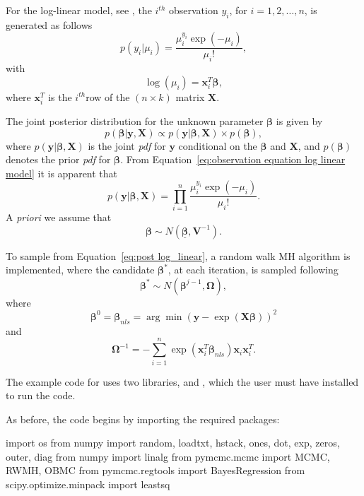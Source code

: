 \documentclass[article]{jss}
\begin{document}
For the log-linear model, see \citet{GelmanCarlinSternRubin2004}, the
$i^{th}$ observation $y_{i}$, for $i=1,2,\dots,n$, is generated as
follows
\begin{equation}
  p(y_{i}|\mu_{i})=\frac{\mu_{i}^{y_{i}}\exp(-\mu_{i})}{\mu_{i}!},\label{eq:observation
    equation log linear model}
\end{equation} with \[
\log(\mu_{i})=\bm{x}_{i}^{T}\bm{\beta},\] where $\bm{x}_{i}^{T}$ is
the $i^{th}$row of the $\left(n\times k\right)$ matrix $\bm{X}.$

The joint posterior distribution for the unknown parameter
$\bm{\beta}$ is given by
\begin{equation}
  p(\bm{\beta}|\bm{y},\bm{X})\propto p(\bm{y}|\bm{\beta},\bm{X})\times
  p(\bm{\beta}),
\label{eq:post log_linear}
\end{equation} 
where $p(\bm{y}|\bm{\beta},\bm{X})$ is the joint \emph{pdf }for
$\bm{y}$ conditional on the $\bm{\beta}$ and $\bm{X}$, and
$p(\bm{\beta})$ denotes the prior \emph{pdf }for $\bm{\beta}.$ From
Equation~\ref{eq:observation equation log linear model} it is apparent that\[
p(\bm{y}|\bm{\beta},\bm{X})=\prod_{i=1}^{n}\frac{\mu_{i}^{y_{i}}\exp(-\mu_{i})}{\mu_{i}!}.\]
A \emph{priori }we assume that \[ \bm{\beta}\sim
N(\bm{\underline{\bm{\beta}}},\bm{V}^{-1}).\]

To sample from Equation~\ref{eq:post log_linear}, a random walk MH algorithm
is implemented, where the candidate $\bm{\beta}^{*}$, at each
iteration, is sampled following \begin{equation} \bm{\beta}^{*}\sim
  N\left(\bm{\beta}^{j-1},\bm{\Omega}\right),\label{eq:candidate
    log-linear}\end{equation} where\[
\bm{\beta}^{0}=\bm{\beta}_{nls}=\arg\min\left(\bm{y}-\exp\left(\bm{X}\bm{\beta}\right)\right)^{2}\]
and\[
\bm{\Omega}^{-1}=-\sum_{i=1}^{n}\exp\left(\bm{x}_{i}^{T}\bm{\beta}_{nls}\right)\bm{x}_{i}\bm{x}_{i}^{T}.\]


The example code for  uses two 
libraries,  and , which the user must have
installed to run the code.  

As before, the code begins by importing the required packages:

\begin{Code}
import os
from numpy import random, loadtxt, hstack, ones, dot, exp, zeros, outer, diag
from numpy import linalg
from pymcmc.mcmc import MCMC, RWMH, OBMC
from pymcmc.regtools import BayesRegression
from scipy.optimize.minpack import leastsq
\end{Code}
\end{document}
